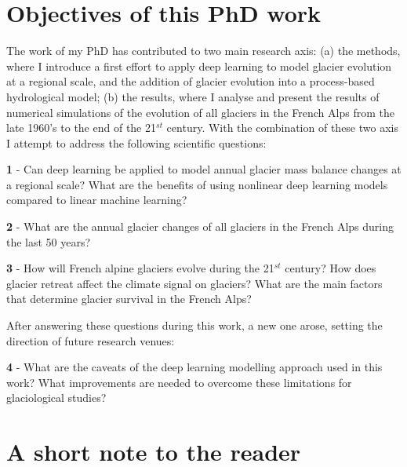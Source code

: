 \section*{Objectives of this PhD work}

The work of my PhD has contributed to two main research axis: (a) the methods, where I introduce a first effort to apply deep learning to model glacier evolution at a regional scale, and the addition of glacier evolution into a process-based hydrological model; (b) the results, where I analyse and present the results of numerical simulations of the evolution of all glaciers in the French Alps from the late 1960's to the end of the 21$^{st}$ century. With the combination of these two axis I attempt to address the following scientific questions:
 
\begin{list}{\textbf{Question}}{}

\item \textbf{1} - Can deep learning be applied to model annual glacier mass balance changes at a regional scale? What are the benefits of using nonlinear deep learning models compared to linear machine learning?

\item \textbf{2}  - What are the annual glacier changes of all glaciers in the French Alps during the last 50 years? 

\item \textbf{3} - How will French alpine glaciers evolve during the 21$^{st}$ century? How does glacier retreat affect the climate signal on glaciers? What are the main factors that determine glacier survival in the French Alps?

\end{list}

After answering these questions during this work, a new one arose, setting the direction of future research venues:

\begin{list}{\textbf{Question}}{}

\item \textbf{4} - What are the caveats of the deep learning modelling approach used in this work? What improvements are needed to overcome these limitations for glaciological studies?

\end{list}

\section*{A short note to the reader}

